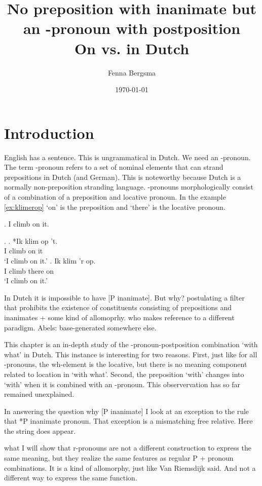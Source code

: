 \documentclass[12pt]{article}
\title{No preposition with inanimate but an \tsc{r}-pronoun with postposition\\
On \tit{waarmee} vs. \tit{met wat} in Dutch}
\author{Fenna Bergsma}
\date{\today}
\begin{document}
\maketitle




\section{Introduction}

English has a sentence. This is ungrammatical in Dutch. We need an -pronoun. The term -pronoun \citep{riemsdijk1978} refers to a set of nominal elements that can strand prepositions in Dutch (and German). This is noteworthy because Dutch is a normally non-preposition stranding language. -pronouns morphologically consist of a combination of a preposition and locative pronoun. In the example \ref{ex:klimerop}  `on' is the preposition and  `there' is the locative pronoun.

\ex. I climb on it.

\ex.
\ag. *Ik klim op 't.\\
 I climb on it\\
 `I climb on it.'\label{ex:klimopt}
\bg. Ik klim 'r op.\\
 I climb there on\\
 `I climb on it.'\label{ex:klimerop}

In Dutch it is impossible to have [P inanimate]. But why? \citet{riemsdijk1978} postulating a filter that prohibits the existence of constituents consisting of prepositions and inanimates + some kind of allomoprhy. \citet{koopman2000} who makes reference to a different paradigm. Abels: base-generated somewhere else.

This chapter is an in-depth study of the -pronoun-postposition combination  `with what' in Dutch. This instance is interesting for two reasons. First, just like for all -pronouns, the wh-element is the locative, but there is no meaning component related to location in `with what'. Second, the preposition  `with' changes into  `with' when it is combined with an -pronoun. This observervation has so far remained unexplained.

In answering the question why [P inanimate] I look at an exception to the rule that *P inanimate pronoun. That exception is a mismatching free relative. Here the string  does appear.

what I will show that r-pronouns are not a different construction to express the same meaning, but they realize the same features as regular P + pronoun combinations. It is a kind of allomorphy, just like Van Riemsdijk said. And not a different way to express the same function.
\end{document}
